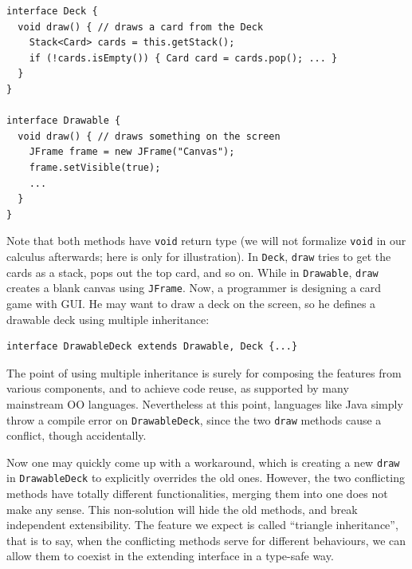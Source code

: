 \vspace{3pt}\begin{lstlisting}
interface Deck {
  void draw() { // draws a card from the Deck
    Stack<Card> cards = this.getStack();
    if (!cards.isEmpty()) { Card card = cards.pop(); ... }
  }
}

interface Drawable {
  void draw() { // draws something on the screen
    JFrame frame = new JFrame("Canvas");
    frame.setVisible(true);
    ...
  }
}
\end{lstlisting}\vspace{3pt}
Note that both methods have \lstinline|void| return type (we will not formalize
\lstinline|void| in our calculus afterwards; here is only for illustration). In \lstinline|Deck|, \lstinline|draw| tries to get the cards as a stack, pops
out the top card, and so on. While in \lstinline|Drawable|, \lstinline|draw|
creates a blank canvas using \lstinline|JFrame|. Now, a programmer is designing a
card game with GUI. He may want to draw a deck on the screen, so he defines a drawable
deck using multiple inheritance:

\vspace{3pt}\begin{lstlisting}
interface DrawableDeck extends Drawable, Deck {...} 
\end{lstlisting}\vspace{3pt}
The point of using multiple inheritance is surely for composing the features from various 
components, and to achieve code reuse, as supported by many mainstream OO
languages. Nevertheless at this point, languages like Java simply throw a compile
error on \lstinline|DrawableDeck|, since the two \lstinline|draw| methods cause a conflict, though accidentally.

Now one may quickly come up with a workaround, which is creating a new \lstinline|draw| in \lstinline|DrawableDeck| to
explicitly overrides the old ones. However, the two conflicting methods have totally different functionalities, merging
them into one does not make any sense. This non-solution will hide the old methods, and break independent extensibility. The
feature we expect is called ``triangle inheritance'', that is to say, when the conflicting methods serve for different behaviours,
we can allow them to coexist in the extending interface in a type-safe way.\\

